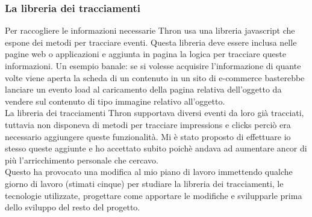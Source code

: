 \documentclass[a4paper, 12pt, twoside, openright]{book}
\begin{document}
\subsubsection{La libreria dei tracciamenti}
Per raccogliere le informazioni necessarie Thron usa una libreria javascript che espone dei metodi per tracciare eventi. Questa libreria deve essere inclusa nelle pagine web o applicazioni e aggiunta in pagina la logica per tracciare queste informazioni. Un esempio banale: se si volesse acquisire l'informazione di quante volte viene aperta la scheda di un contenuto in un sito di e-commerce basterebbe lanciare un evento load al caricamento della pagina relativa dell'oggetto da vendere sul contenuto di tipo immagine relativo all'oggetto.\\
La libreria dei tracciamenti Thron supportava diversi eventi da loro già tracciati, tuttavia non disponeva di metodi per tracciare impressions e clicks perciò era necessario aggiungere queste funzionalità. Mi è stato proposto di effettuare io stesso queste aggiunte e ho accettato subito poichè andava ad aumentare ancor di più l'arricchimento personale che cercavo.\\
Questo ha provocato una modifica al mio piano di lavoro immettendo qualche giorno di lavoro (stimati cinque) per studiare la libreria dei tracciamenti, le tecnologie utilizzate, progettare come apportare le modifiche e svilupparle prima dello sviluppo del resto del progetto.\\
\end{document}
